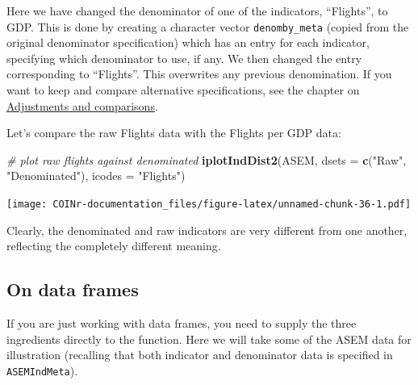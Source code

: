 \documentclass[
]{book}
\newenvironment{Shaded}{\begin{snugshade}}{\end{snugshade}}
\newcommand{\CommentTok}[1]{\textcolor[rgb]{0.56,0.35,0.01}{\textit{#1}}}
\newcommand{\DataTypeTok}[1]{\textcolor[rgb]{0.13,0.29,0.53}{#1}}
\newcommand{\KeywordTok}[1]{\textcolor[rgb]{0.13,0.29,0.53}{\textbf{#1}}}
\newcommand{\NormalTok}[1]{#1}
\newcommand{\StringTok}[1]{\textcolor[rgb]{0.31,0.60,0.02}{#1}}
\begin{document}
Here we have changed the denominator of one of the indicators, ``Flights'', to GDP. This is done by creating a character vector \texttt{denomby\_meta} (copied from the original denominator specification) which has an entry for each indicator, specifying which denominator to use, if any. We then changed the entry corresponding to ``Flights''. This overwrites any previous denomination. If you want to keep and compare alternative specifications, see the chapter on \protect\hyperlink{adjustments-and-comparisons}{Adjustments and comparisons}.

Let's compare the raw Flights data with the Flights per GDP data:

\begin{Shaded}
\begin{Highlighting}[]
\CommentTok{# plot raw flights against denominated}
\KeywordTok{iplotIndDist2}\NormalTok{(ASEM, }\DataTypeTok{dsets =} \KeywordTok{c}\NormalTok{(}\StringTok{"Raw"}\NormalTok{, }\StringTok{"Denominated"}\NormalTok{), }\DataTypeTok{icodes =} \StringTok{"Flights"}\NormalTok{)}
\end{Highlighting}
\end{Shaded}

\texttt{[image: COINr-documentation\_files/figure-latex/unnamed-chunk-36-1.pdf]}

Clearly, the denominated and raw indicators are very different from one another, reflecting the completely different meaning.

\hypertarget{on-data-frames}{%
\subsection{On data frames}\label{on-data-frames}}

If you are just working with data frames, you need to supply the three ingredients directly to the function. Here we will take some of the ASEM data for illustration (recalling that both indicator and denominator data is specified in \texttt{ASEMIndMeta}).
\end{document}
